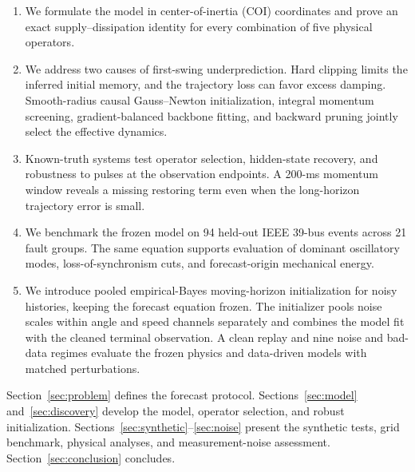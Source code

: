 \begin{enumerate}
 \item We formulate the model in center-of-inertia (COI) coordinates and
       prove an exact supply--dissipation identity for every combination of
       five physical operators.
 \item We address two causes of first-swing underprediction. Hard clipping
       limits the inferred initial memory, and the trajectory loss can favor
       excess damping. Smooth-radius causal Gauss--Newton initialization,
       integral momentum screening, gradient-balanced backbone fitting,
       and backward pruning jointly select the effective dynamics.
 \item Known-truth systems test operator selection, hidden-state recovery,
       and robustness to pulses at the observation endpoints. A 200-ms
       momentum window reveals a missing restoring term even when the
       long-horizon trajectory error is small.
 \item We benchmark the frozen model on 94 held-out IEEE 39-bus events
       across 21 fault groups. The same equation supports evaluation of
       dominant oscillatory modes, loss-of-synchronism cuts, and
       forecast-origin mechanical energy.
 \item We introduce pooled empirical-Bayes moving-horizon initialization
       for noisy histories, keeping the forecast equation frozen. The
       initializer pools noise scales within angle and speed channels
       separately and combines the model fit with the cleaned terminal
       observation. A clean replay and nine noise and bad-data regimes
       evaluate the frozen physics and data-driven models with matched
       perturbations.
\end{enumerate}

Section~\ref{sec:problem} defines the forecast protocol.
Sections~\ref{sec:model} and~\ref{sec:discovery} develop the model, operator
selection, and robust initialization. Sections~\ref{sec:synthetic}--\ref{sec:noise}
present the synthetic tests, grid benchmark, physical analyses, and
measurement-noise assessment. Section~\ref{sec:conclusion} concludes.
